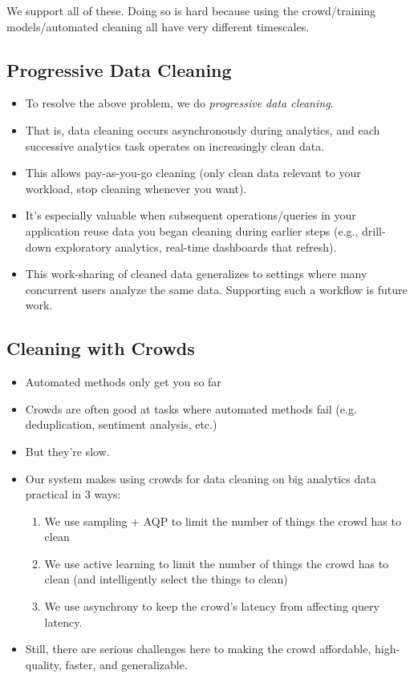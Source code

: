 We support all of these. 
Doing so is hard because using the crowd/training models/automated cleaning all have very different timescales.

\subsection{Progressive Data Cleaning}
\begin{itemize}
\item To resolve the above problem, we do \textit{progressive data cleaning}. 
\item That is, data cleaning occurs asynchronously during analytics, and each successive analytics task operates on increasingly clean data. 
\item This allows pay-as-you-go cleaning (only clean data relevant to your workload, stop cleaning whenever you want).
\item It's especially valuable when subsequent operations/queries in your application reuse data you began cleaning during earlier steps (e.g., drill-down exploratory analytics, real-time dashboards that refresh).
\item This work-sharing of cleaned data generalizes to settings where many concurrent users analyze the same data. Supporting such a workflow is future work.
\end{itemize}

\subsection{Cleaning with Crowds}
\begin{itemize}
\item Automated methods only get you so far
\item Crowds are often good at tasks where automated methods fail (e.g. deduplication, sentiment analysis, etc.)
\item But they're slow.
\item Our system makes using crowds for data cleaning on big analytics data practical in 3 ways:
	\begin{enumerate}
	\item We use sampling + AQP to limit the number of things the crowd has to clean
	\item We use active learning to limit the number of things the crowd has to clean (and intelligently select the things to clean)
	\item We use asynchrony to keep the crowd's latency from affecting query latency.
	\end{enumerate}
\item Still, there are serious challenges here to making the crowd affordable, high-quality, faster, and generalizable.
\end{itemize}

